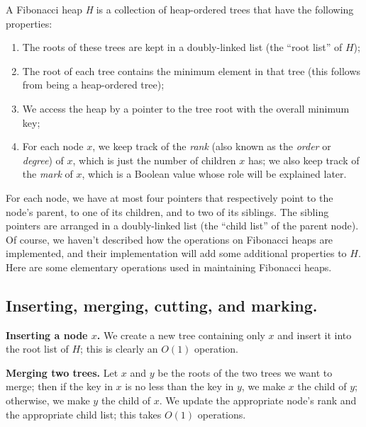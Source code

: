 \documentclass{article}
\begin{document}
\vspace{.25cm}

\noindent A Fibonacci heap \emph{H} is a collection of heap-ordered trees that
have
the following properties:
\begin{enumerate}
\item The roots of these trees are kept in a doubly-linked list (the
``root list'' of $H$);
\item The root of each tree contains the minimum element in that tree
(this follows from being a heap-ordered tree);
\item We access the heap by a pointer to the tree root with the overall
minimum key;
\item For each node $x$, we keep track of the \emph{rank} (also known as
the \emph{order} or \emph{degree}) of $x$, which is just the number of
children $x$ has; we also keep track of the \emph{mark} of $x$, which is
a Boolean value whose role will be explained later.
\end{enumerate}


\vspace{.25cm}

\noindent For each node, we have at most four pointers that respectively
point to the node's parent, to one of its children, and to two of its
siblings. The sibling pointers are arranged in a doubly-linked list (the
``child list'' of the parent node).
Of course, we haven't described how the operations on
Fibonacci heaps are implemented, and their implementation will add some
additional properties to $H$.
Here are some elementary operations used in maintaining Fibonacci heaps.

\subsection{Inserting, merging, cutting, and marking.}

\textbf{Inserting a node $x$.} We create a new tree containing only $x$
and insert it into the root list of $H$; this is clearly an $O(1)$
operation.

\vspace{.25cm}

\noindent \textbf{Merging two trees.} Let $x$ and $y$ be the roots of
the two trees we want to merge; then if the key in $x$ is no less than
the key in $y$, we make $x$ the child of $y$; otherwise, we make $y$ the
child of $x$. We update the appropriate node's rank and the appropriate
child list; this takes $O(1)$
operations.  
\end{document}

